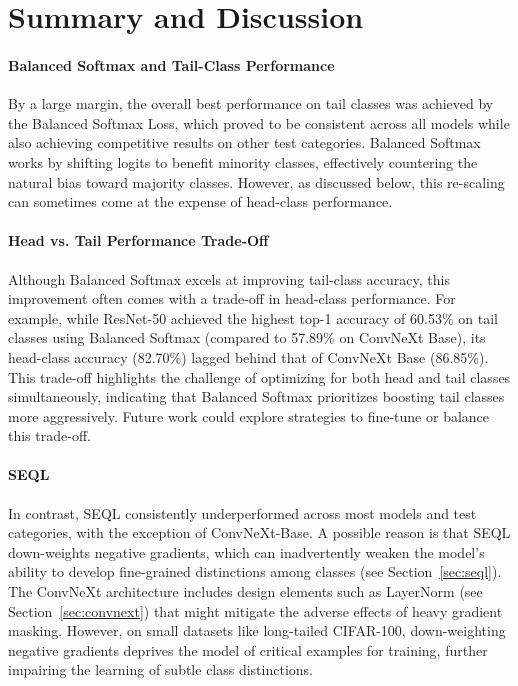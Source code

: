 
\section{Summary and Discussion}

\paragraph{Balanced Softmax and Tail-Class Performance}
By a large margin, the overall best performance on tail classes was achieved by the Balanced Softmax Loss, which proved to be consistent across all models while also achieving competitive results on other test categories. Balanced Softmax works by shifting logits to benefit minority classes, effectively countering the natural bias toward majority classes. However, as discussed below, this re-scaling can sometimes come at the expense of head-class performance.

\paragraph{Head vs. Tail Performance Trade-Off}
Although Balanced Softmax excels at improving tail-class accuracy, this improvement often comes with a trade-off in head-class performance. For example, while ResNet-50 achieved the highest top-1 accuracy of 60.53\% on tail classes using Balanced Softmax (compared to 57.89\% on ConvNeXt Base), its head-class accuracy (82.70\%) lagged behind that of ConvNeXt Base (86.85\%). This trade-off highlights the challenge of optimizing for both head and tail classes simultaneously, indicating that Balanced Softmax prioritizes boosting tail classes more aggressively. Future work could explore strategies to fine-tune or balance this trade-off.


\paragraph{SEQL}
In contrast, SEQL consistently underperformed across most models and test categories, with the exception of ConvNeXt-Base. A possible reason is that SEQL down-weights negative gradients, which can inadvertently weaken the model's ability to develop fine-grained distinctions among classes (see Section~\ref{sec:seql}). The ConvNeXt architecture includes design elements such as LayerNorm (see Section~\ref{sec:convnext}) that might mitigate the adverse effects of heavy gradient masking. However, on small datasets like long-tailed CIFAR-100, down-weighting negative gradients deprives the model of critical examples for training, further impairing the learning of subtle class distinctions.

